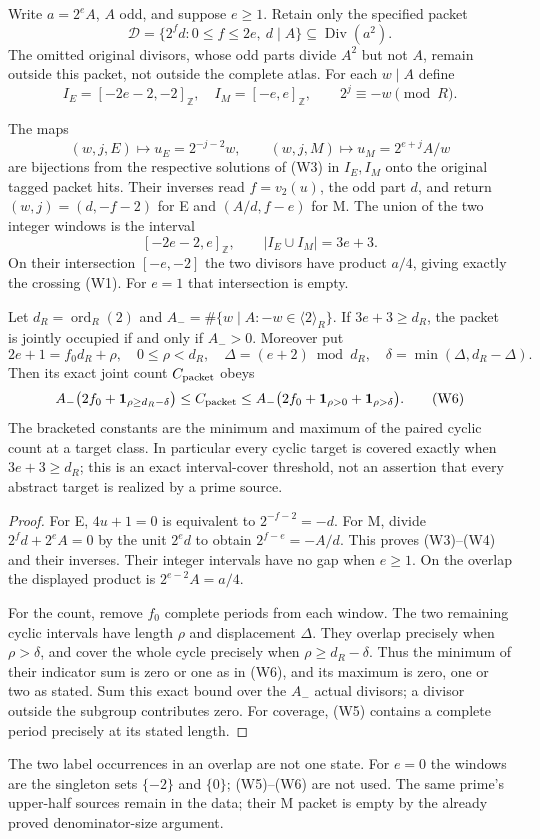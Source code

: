 Write $a=2^e A$, $A$ odd, and suppose $e\ge1$. Retain only the specified packet
\[
 \mathscr D=\{2^fd:0\le f\le2e,\ d\mid A\}\subseteq\operatorname{Div}(a^2).
                                                               \tag{W2}
\]
The omitted original divisors, whose odd parts divide $A^2$ but not $A$, remain
outside this packet, not outside the complete atlas. For each $w\mid A$ define
\[
 I_E=[-2e-2,-2]_{\mathbb Z},\quad I_M=[-e,e]_{\mathbb Z},\qquad
 2^j\equiv-w\pmod R.                                      \tag{W3}
\]
\begin{theorem}\label{thm:windows}
The maps
\[
 (w,j,E)\longmapsto u_E=2^{-j-2}w,\qquad
 (w,j,M)\longmapsto u_M=2^{e+j}A/w                         \tag{W4}
\]
are bijections from the respective solutions of (W3) in $I_E,I_M$ onto the
original tagged packet hits. Their inverses read $f=v_2(u)$, the odd part $d$,
and return $(w,j)=(d,-f-2)$ for E and $(A/d,f-e)$ for M.
The union of the two integer windows is the interval
\[
 [-2e-2,e]_{\mathbb Z},\qquad |I_E\cup I_M|=3e+3.          \tag{W5}
\]
On their intersection $[-e,-2]$ the two divisors have product $a/4$, giving
exactly the crossing (W1). For $e=1$ that intersection is empty.

Let $d_R=\operatorname{ord}_R(2)$ and
$A_- =\#\{w\mid A:-w\in\langle2\rangle_R\}$. If $3e+3\ge d_R$, the packet
is jointly occupied if and only if $A_->0$. Moreover put
\[
 2e+1=f_0d_R+\rho,\quad0\le\rho<d_R,\quad
 \Delta=(e+2)\bmod d_R,\quad\delta=\min(\Delta,d_R-\Delta).
\]
Then its exact joint count $C_{\rm packet}$ obeys
\[
 A_-\bigl(2f_0+\mathbf1_{\rho\ge d_R-\delta}\bigr)
 \le C_{\rm packet}\le
 A_-\bigl(2f_0+\mathbf1_{\rho>0}+\mathbf1_{\rho>\delta}\bigr). \tag{W6}
\]
The bracketed constants are the minimum and maximum of the paired cyclic
count at a target class. In particular every cyclic target is covered exactly
when $3e+3\ge d_R$; this is an exact interval-cover threshold, not an assertion
that every abstract target is realized by a prime source.
\end{theorem}
\begin{proof}
For E, $4u+1=0$ is equivalent to $2^{-f-2}=-d$. For M, divide
$2^fd+2^eA=0$ by the unit $2^ed$ to obtain $2^{f-e}=-A/d$.
This proves (W3)--(W4) and their inverses. Their integer intervals have no gap
when $e\ge1$. On the overlap the displayed product is $2^{e-2}A=a/4$.

For the count, remove $f_0$ complete periods from each window. The two remaining
cyclic intervals have length $\rho$ and displacement $\Delta$. They overlap
precisely when $\rho>\delta$, and cover the whole cycle precisely when
$\rho\ge d_R-\delta$. Thus the minimum of their indicator sum is zero or one
as in (W6), and its maximum is zero, one or two as stated. Sum this exact bound
over the $A_-$ actual divisors; a divisor outside the subgroup contributes zero.
For coverage, (W5) contains a complete period precisely at its stated length.
\end{proof}
The two label occurrences in an overlap are not one state. For $e=0$ the
windows are the singleton sets $\{-2\}$ and $\{0\}$; (W5)--(W6) are not used.
The same prime's upper-half sources remain in the data; their M packet is empty
by the already proved denominator-size argument.

